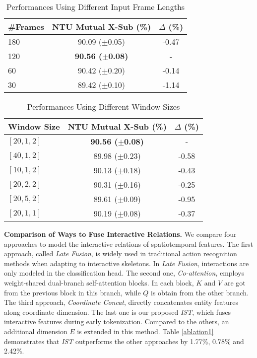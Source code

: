 \documentclass[letterpaper, 10 pt, conference]{ieeeconf}
\begin{document}
\begin{table}[t]
	\centering
	\caption{Performances Using Different Input Frame Lengths}
	\vspace{-0.7em}
	\label{ablation4}
\begin{tabular}{l|c|c}
            \hline
               \#Frames & NTU Mutual X-Sub (\%) & $\Delta$ (\%)\\
		\hline
                180 & 90.09 ($\pm$0.05) & -0.47\\
                120 & \textbf{90.56 ($\pm$0.08)} & - \\
                60 & 90.42 ($\pm$0.20) & -0.14\\
                30 & 89.42 ($\pm$0.10) & -1.14\\
            \hline
	\end{tabular}
\vspace{-1.0em}
\end{table}

\begin{table}[t]
	\centering
	\caption{Performances Using Different Window Sizes}
	\vspace{-0.7em}
	\label{ablation5}
\begin{tabular}{l|c|c}
            \hline
               Window Size & NTU Mutual X-Sub (\%) & $\Delta$ (\%)\\
		\hline
                $[20, 1, 2]$ & \textbf{90.56 ($\pm$0.08)} & - \\
            \hline
                $[40, 1, 2]$ & 89.98 ($\pm$0.23)& -0.58\\
                $[10, 1, 2]$ & 90.13 ($\pm$0.18)& -0.43\\
            \hline
                $[20, 2, 2]$ & 90.31 ($\pm$0.16)& -0.25\\
                $[20, 5, 2]$ & 89.61 ($\pm$0.09)& -0.95\\
            \hline
                $[20, 1, 1]$ & 90.19 ($\pm$0.08)& -0.37\\
            \hline
	\end{tabular}
\vspace{-1.0em}
\end{table}


\textbf{Comparison of Ways to Fuse Interactive Relations.} We compare four approaches to model the interactive relations of spatiotemporal features. The first approach, called \textit{Late Fusion}, is widely used in traditional action recognition methods when adapting to interactive skeletons. In \textit{Late Fusion}, interactions are only modeled in the classification head. The second one, \textit{Co-attention}, employs weight-shared dual-branch self-attention blocks. In each block, $K$ and $V$ are got from the previous block in this branch, while $Q$ is obtain from the other branch. The third approach, \textit{Coordinate Concat}, directly concatenates entity features along coordinate dimension. The last one is our proposed \textit{IST}, which fuses interactive features during early tokenization. Compared to the others, an additional dimension $E$ is extended in this method. Table \ref{ablation1} demonstrates that \textit{IST} outperforms the other approaches by 1.77\%, 0.78\% and 2.42\%.
\end{document}
